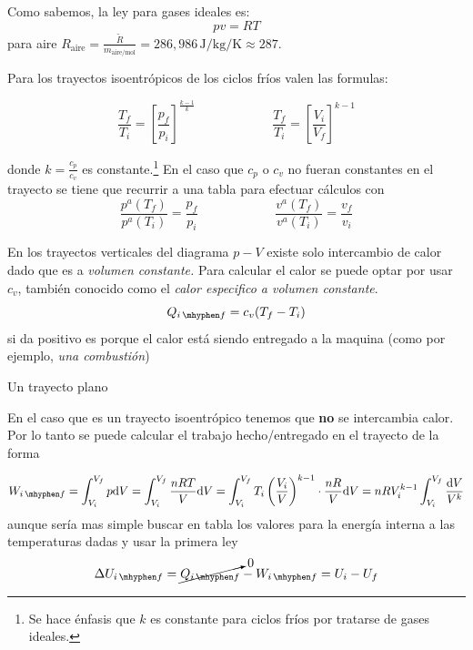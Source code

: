 \documentclass{article}
\newcommand{\ctegas}{k}
\newcommand{\inicial}{i}
\newcommand{\final}{f}
\newcommand{\di}{\textrm{d}}
\newcommand{\hyph}{\,\mhyphen}
\begin{document}
Como sabemos, la ley para gases ideales es:
\begin{equation}
pv=RT
\end{equation}
para aire  $R_{\textrm{aire}}=\frac{\tilde{R}}{m_{\textrm{aire/mol}}}=286,986\, \si{\joule \per \kilogram \per \kelvin}\approx 287$.


Para los trayectos isoentrópicos de los ciclos fríos valen las formulas:

\begin{equation}\label{eq:relacionisoentrop}
\frac{T_\final}{T_\inicial} = \left[ \frac{p_\final}{p_\inicial}\right]^{\frac{\ctegas-1}{\ctegas}} \qquad\qquad\qquad \frac{T_\final}{T_\inicial} = \left[ \frac{V_\inicial}{V_\final} \right]^{\ctegas-1}\!\!
\end{equation}

donde $\ctegas=\frac{c_p}{c_v}$ es constante.\footnote{Se hace énfasis que $\ctegas$ es constante para ciclos fríos por tratarse de gases ideales.} En el caso que $c_p$ o $c_v$ no fueran constantes en el trayecto se tiene que recurrir a una tabla para efectuar cálculos con
\[
\frac{p^a(T_\final)}{p^a(T_\inicial)}=\frac{p_\final}{p_\inicial}\qquad \qquad \qquad \frac{v^a(T_\final)}{v^a(T_\inicial)}=\frac{v_\final}{v_\inicial}
\]

En los trayectos verticales del diagrama $p-V$ existe solo intercambio de calor dado que es a \textit{volumen constante.} Para calcular el calor se puede optar por usar $c_v$, también conocido como el \textit{calor especifico a volumen constante}.
\[
Q_{\inicial\hyph\final} = c_v (T_\final - T_\inicial)
\]
si da positivo es porque el calor está siendo entregado a la maquina (como por ejemplo,\textit{ una combustión})

Un trayecto plano


En el caso que es un trayecto isoentrópico tenemos que \textbf{no} se intercambia calor. Por lo tanto se puede calcular el trabajo hecho/entregado en el trayecto de la forma

\[
W_{\inicial\hyph\final}=\int_{V_\inicial}^{V_\final}p \di V =\int_{V_\inicial}^{V_\final} \frac{nRT}{V} \di V =\int_{V_\inicial}^{V_\final} T_\inicial\left( \frac{V_\inicial}{V} \right)^{\ctegas-1}\cdot\frac{nR}{V} \di V =nRV_\inicial^{\ctegas-1}  \int_{V_\inicial}^{V_\final} \frac{\di V}{V^\ctegas}
\]
aunque sería mas simple buscar en tabla los valores para la energía interna a las temperaturas dadas y usar la primera ley
\[
\Delta U_{\inicial \hyph \final}= \cancelto{0}{Q_{\inicial\hyph \final}} - W_{\inicial\hyph \final} = U_{\inicial}-U_{\final}
\]
\end{document}
